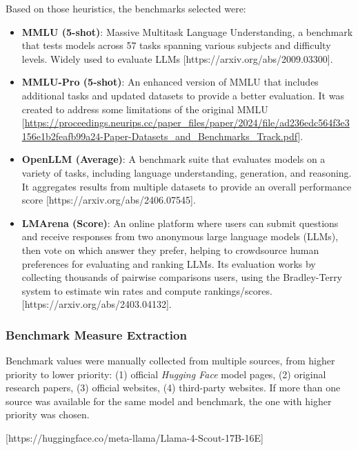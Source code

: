         Based on those heuristics, the benchmarks selected were:
        \begin{itemize}
            \item \textbf{MMLU (5-shot)}: Massive Multitask Language Understanding, a benchmark that tests models across 57 tasks spanning various subjects and difficulty levels. Widely used to evaluate LLMs [https://arxiv.org/abs/2009.03300].

            \item \textbf{MMLU-Pro (5-shot)}: An enhanced version of MMLU that includes additional tasks and updated datasets to provide a better evaluation. It was created to address some limitations of the original MMLU [\url{https://proceedings.neurips.cc/paper_files/paper/2024/file/ad236edc564f3e3156e1b2feafb99a24-Paper-Datasets_and_Benchmarks_Track.pdf}].
            
            \item \textbf{OpenLLM (Average)}: A benchmark suite that evaluates models on a variety of tasks, including language understanding, generation, and reasoning. It aggregates results from multiple datasets to provide an overall performance score [https://arxiv.org/abs/2406.07545].
            
            \item \textbf{LMArena (Score)}: An online platform where users can submit questions and receive responses from two anonymous large language models (LLMs), then vote on which answer they prefer, helping to crowdsource human preferences for evaluating and ranking LLMs. Its evaluation works by collecting thousands of pairwise comparisons users, using  the Bradley-Terry system to estimate win rates and compute rankings/scores. [https://arxiv.org/abs/2403.04132].
        \end{itemize}

    \subsubsection{Benchmark Measure Extraction}

        Benchmark values were manually collected from multiple sources, from higher priority to lower priority: (1) official \textit{Hugging Face} model pages, (2) original research papers, (3) official websites, (4) third-party websites. If more than one source was available for the same model and benchmark, the one with higher priority was chosen.

        [https://huggingface.co/meta-llama/Llama-4-Scout-17B-16E]


